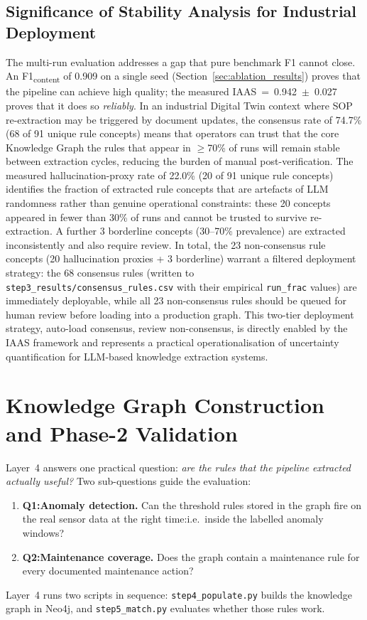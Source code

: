 ﻿\documentclass[11pt]{article}
\begin{document}
\subsection{Significance of Stability Analysis for Industrial Deployment}
\label{sec:multirun_significance}

The multi-run evaluation addresses a gap that pure benchmark F1 cannot close.
An F1\textsubscript{content} of 0.909 on a single seed (Section~\ref{sec:ablation_results})
proves that the pipeline can achieve high quality; the measured IAAS~=~0.942~$\pm$~0.027
proves that it does so \emph{reliably}.
In an industrial Digital Twin context where SOP re-extraction may be triggered
by document updates, the consensus rate of 74.7\% (68 of 91 unique rule concepts)
means that operators can trust that the core Knowledge Graph the rules that appear
in $\geq$70\% of runs will remain stable between extraction cycles, reducing the
burden of manual post-verification.
The measured hallucination-proxy rate of 22.0\% (20 of 91 unique rule concepts)
identifies the fraction of extracted rule concepts that are artefacts of LLM
randomness rather than genuine operational constraints: these 20 concepts appeared
in fewer than 30\% of runs and cannot be trusted to survive re-extraction.
A further 3 borderline concepts (30--70\% prevalence) are extracted inconsistently
and also require review.
In total, the 23 non-consensus rule concepts (20 hallucination proxies + 3
borderline) warrant a filtered deployment strategy: the 68 consensus rules (written
to \texttt{step3\_results/consensus\_rules.csv} with their empirical
\texttt{run\_frac} values) are immediately deployable, while all 23 non-consensus
rules should be queued for human review before loading into a production graph.
This two-tier deployment strategy, auto-load consensus, review non-consensus,
is directly enabled by the IAAS framework and represents a practical operationalisation
of uncertainty quantification for LLM-based knowledge extraction systems.

\section{Knowledge Graph Construction and Phase-2 Validation}
\label{sec:neo4j}

Layer~4 answers one practical question: \emph{are the rules that the pipeline
extracted actually useful?} Two sub-questions guide the evaluation:
\begin{enumerate}
  \item \textbf{Q1:Anomaly detection.} Can the threshold rules stored in
        the graph fire on the real sensor data at the right time:i.e.\ inside
        the labelled anomaly windows?
  \item \textbf{Q2:Maintenance coverage.} Does the graph contain a
        maintenance rule for every documented maintenance action?
\end{enumerate}
Layer~4 runs two scripts in sequence: \texttt{step4\_populate.py} builds the
knowledge graph in Neo4j, and \texttt{step5\_match.py} evaluates whether those
rules work.
\end{document}
